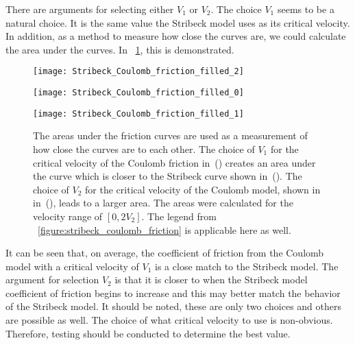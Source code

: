 There are arguments for selecting either $V_1$ or $V_2$.  The choice $V_1$ seems to be a natural choice.  It is the same value the Stribeck model uses as its critical velocity.  In addition, as a method to measure how close the curves are, we could calculate the area under the curves.  In \figurename~\ref{fig:frictionmodelareaundercurves}, this is demonstrated.
\begin{figure}
	\begin{minipage}[t]{\linewidth}
		\begin{minipage}[t]{0.325\linewidth}
			\centering
			\texttt{[image: Stribeck\_Coulomb\_friction\_filled\_2]}
			\label{fig:Stribeck_Coulomb_friction_filled_2}
		\end{minipage}
		\hfill
		\begin{minipage}[t]{0.325\linewidth}
			\centering
			\texttt{[image: Stribeck\_Coulomb\_friction\_filled\_0]}
			\label{fig:Stribeck_Coulomb_friction_filled_0}
		\end{minipage}
		\hfill
		\begin{minipage}[t]{0.325\linewidth}
			\centering
			\texttt{[image: Stribeck\_Coulomb\_friction\_filled\_1]}
			\label{fig:Stribeck_Coulomb_friction_filled_1}
		\end{minipage}
	\end{minipage}
    \caption[Areas under friction curves]{The areas under the friction curves are used as a measurement of how close the curves are to each other.  The choice of $V_1$ for the critical velocity of the Coulomb friction in~() creates an area under the curve which is closer to the Stribeck curve shown in~().  The choice of $V_2$ for the critical velocity of the Coulomb model, shown in in~(), leads to a larger area.  The areas were calculated for the velocity range of $[0, 2V_2]$.  The legend from \figurename~\ref{figure:stribeck_coulomb_friction} is applicable here as well.}
	\label{fig:frictionmodelareaundercurves}
\end{figure}
It can be seen that, on average, the coefficient of friction from the Coulomb model with a critical velocity of $V_1$ is a close match to the Stribeck model.  The argument for selection $V_2$ is that it is closer to when the Stribeck model coefficient of friction begins to increase and this may better match the behavior of the Stribeck model.  It should be noted, these are only two choices and others are possible as well.  The choice of what critical velocity to use is non-obvious.  Therefore, testing should be conducted to determine the best value.


